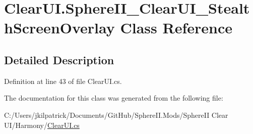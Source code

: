 \hypertarget{class_clear_u_i_1_1_sphere_i_i___clear_u_i___stealth_screen_overlay}{}\section{Clear\+U\+I.\+Sphere\+I\+I\+\_\+\+Clear\+U\+I\+\_\+\+Stealth\+Screen\+Overlay Class Reference}
\label{class_clear_u_i_1_1_sphere_i_i___clear_u_i___stealth_screen_overlay}


\subsection{Detailed Description}


Definition at line 43 of file Clear\+U\+I.\+cs.



The documentation for this class was generated from the following file\+:\begin{DoxyCompactItemize}
\item 
C\+:/\+Users/jkilpatrick/\+Documents/\+Git\+Hub/\+Sphere\+I\+I.\+Mods/\+Sphere\+I\+I Clear U\+I/\+Harmony/\mbox{\hyperlink{_clear_u_i_8cs}{Clear\+U\+I.\+cs}}\end{DoxyCompactItemize}
